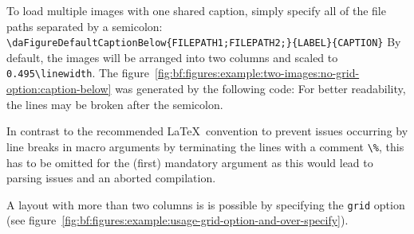 	\newpage To load multiple images with one shared caption, simply specify all of the file paths separated by a semicolon: \lstinline$\daFigureDefaultCaptionBelow{FILEPATH1;FILEPATH2;}{LABEL}{CAPTION}$
	\newline By default, the images will be arranged into two columns and scaled to \lstinline$0.495\linewidth$. 
	\newline The \mbox{figure \ref{fig:bf:figures:example:two-images:no-grid-option:caption-below}} was generated by the following code:
	\lstset{style=LaTeX}
	For better readability, the lines may be broken after the semicolon.
	\begin{daWarningBox}
		In contrast to the recommended \LaTeX~convention to prevent issues occurring by line breaks in macro arguments by terminating the lines with a comment \lstinline$\%$, this has to be omitted for the (first) mandatory argument as this would lead to parsing issues and an aborted compilation.
	\end{daWarningBox}
	A layout with more than two columns is is possible by specifying the \lstinline$grid$ option (see \mbox{figure \ref{fig:bf:figures:example:usage-grid-option-and-over-specify}}).
	\vspace{-0.125cm}


